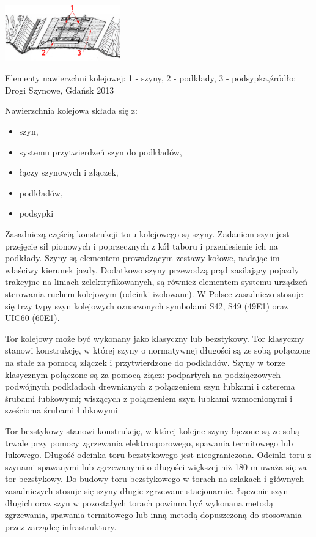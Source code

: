 \begin{marginfigure}
	\includegraphics[width=5cm]{skryptkierownik-img/budowa-toru.png}
	\caption{Elementy nawierzchni kolejowej: 1 - szyny, 2 - podkłady, 3 - podsypka,źródło: Drogi Szynowe, Gdańsk 2013}
	\label{fig:tory}
\end{marginfigure}

Nawierzchnia kolejowa składa się z:
\begin{itemize}
\item szyn,
\item systemu przytwierdzeń szyn do podkładów,
\item łączy szynowych i złączek,
\item podkładów,
\item podsypki 
\end{itemize}


Zasadniczą częścią konstrukcji toru kolejowego są szyny. Zadaniem szyn jest przejęcie sił pionowych i poprzecznych z kół taboru i przeniesienie ich na podkłady. Szyny są elementem prowadzącym zestawy kołowe, nadając im właściwy kierunek jazdy. Dodatkowo szyny przewodzą prąd zasilający pojazdy trakcyjne na liniach zelektryfikowanych, są również elementem systemu urządzeń sterowania ruchem kolejowym (odcinki izolowane). W Polsce zasadniczo stosuje się trzy typy szyn kolejowych oznaczonych symbolami S42, S49 (49E1)
oraz UIC60 (60E1).

Tor kolejowy może być wykonany jako klasyczny lub bezstykowy. Tor klasyczny stanowi konstrukcję, w której szyny o normatywnej długości są ze sobą połączone na stałe za pomocą złączek i przytwierdzone do podkładów. Szyny w torze klasycznym połączone są za pomocą złącz:
podpartych na podzłączowych podwójnych podkładach drewnianych z połączeniem szyn łubkami i czterema śrubami łubkowymi;
wiszących z połączeniem szyn łubkami wzmocnionymi i sześcioma śrubami łubkowymi 

Tor bezstykowy stanowi konstrukcję, w której kolejne szyny łączone są ze sobą trwale przy pomocy
zgrzewania elektrooporowego, spawania termitowego lub łukowego. Długość odcinka toru
bezstykowego jest nieograniczona. Odcinki toru z szynami spawanymi lub zgrzewanymi o długości
większej niż 180 m uważa się za tor bezstykowy. Do budowy toru bezstykowego w torach na szlakach
i głównych zasadniczych stosuje się szyny długie zgrzewane stacjonarnie. Łączenie szyn długich oraz
szyn w pozostałych torach powinna być wykonana metodą zgrzewania, spawania termitowego
lub inną metodą dopuszczoną do stosowania przez zarządcę infrastruktury. 

